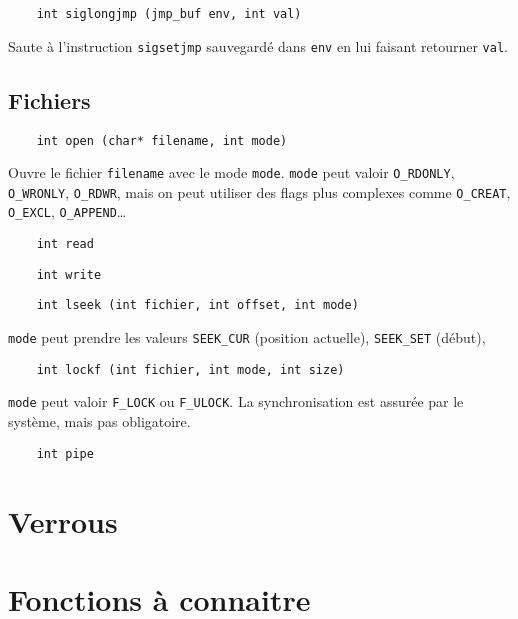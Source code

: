 \documentclass[10pt,twocolumn,a4paper]{article}
\begin{document}
\begin{lstlisting}
    int siglongjmp (jmp_buf env, int val)
\end{lstlisting}
Saute à l'instruction \texttt{sigsetjmp} sauvegardé dans \texttt{env} en lui faisant retourner \texttt{val}.

\subsection{Fichiers}

\begin{lstlisting}
    int open (char* filename, int mode)
\end{lstlisting}
Ouvre le fichier \texttt{filename} avec le mode \texttt{mode}. \texttt{mode} peut valoir \texttt{O\_RDONLY}, \texttt{O\_WRONLY}, \texttt{O\_RDWR}, mais on peut utiliser des flags plus complexes comme \texttt{O\_CREAT}, \texttt{O\_EXCL}, \texttt{O\_APPEND}\ldots

\begin{lstlisting}
    int read
\end{lstlisting}

\begin{lstlisting}
    int write
\end{lstlisting}

\begin{lstlisting}
    int lseek (int fichier, int offset, int mode)
\end{lstlisting}
\texttt{mode} peut prendre les valeurs \texttt{SEEK\_CUR} (position actuelle), \texttt{SEEK\_SET} (début), 

\begin{lstlisting}
    int lockf (int fichier, int mode, int size)
\end{lstlisting}
\texttt{mode} peut valoir \texttt{F\_LOCK} ou \texttt{F\_ULOCK}.
La synchronisation est assurée par le système, mais pas obligatoire.

\begin{lstlisting}
    int pipe
\end{lstlisting}








\section{Verrous}

\section{Fonctions à connaitre}
\end{document}
